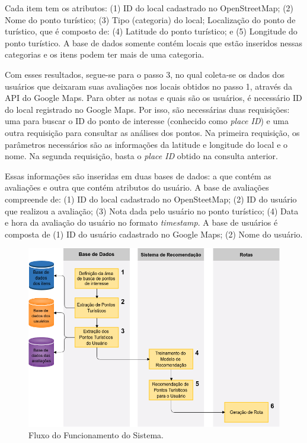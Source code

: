 Cada item tem os atributos: (1) ID do local cadastrado no OpenStreetMap; (2) Nome do ponto turístico; (3) Tipo (categoria) do local; Localização do ponto de turístico, que é composto de: (4) Latitude do ponto turístico; e (5) Longitude do ponto turístico. A base de dados somente contém locais que estão inseridos nessas categorias e os itens podem ter mais de uma categoria.

Com esses resultados, segue-se para o passo 3, no qual coleta-se os dados dos usuários que deixaram suas avaliações nos locais obtidos no passo 1, através da API do Google Maps. Para obter as notas e quais são os usuários, é necessário ID do local registrado no Google Maps. Por isso, são necessárias duas requisições: uma para buscar o ID do ponto de interesse (conhecido como \textit{place ID}) e uma outra requisição para consultar as análises dos pontos. Na primeira requisição, os parâmetros necessários são as informações da latitude e longitude do local e o nome. Na segunda requisição, basta o \textit{place ID} obtido na consulta anterior.

Essas informações são inseridas em duas bases de dados: a que contém as avaliações e outra que contém atributos do usuário. A base de avaliações compreende de: (1) ID do local cadastrado no OpenSteetMap; (2) ID do usuário que realizou a avaliação; (3) Nota dada pelo usuário no ponto turístico; (4) Data e hora da avaliação do usuário no formato \textit{timestamp}. A base de usuários é composta de (1) ID do usuário cadastrado no Google Maps; (2) Nome do usuário.

\begin{figure}[H]
    \centering
    \includegraphics[width=\textwidth]{images/Tourisys_Funcionamento.png}
    \caption{Fluxo do Funcionamento do Sistema.}
    \label{fig:tourisys_operation}
\end{figure}

